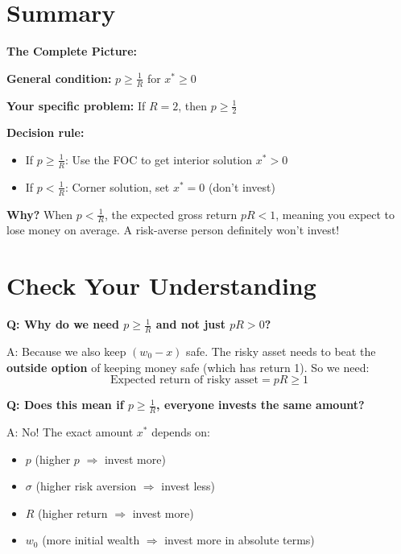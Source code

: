 \documentclass[12pt]{article}
\begin{document}
\section*{Summary}

\begin{tcolorbox}[colback=yellow!20!white,colframe=orange!75!black]
\textbf{The Complete Picture:}

\vspace{0.3cm}

\textbf{General condition:} $p \geq \frac{1}{R}$ for $x^* \geq 0$

\vspace{0.3cm}

\textbf{Your specific problem:} If $R = 2$, then $p \geq \frac{1}{2}$

\vspace{0.3cm}

\textbf{Decision rule:}
\begin{itemize}
\item If $p \geq \frac{1}{R}$: Use the FOC to get interior solution $x^* > 0$
\item If $p < \frac{1}{R}$: Corner solution, set $x^* = 0$ (don't invest)
\end{itemize}

\vspace{0.3cm}

\textbf{Why?} When $p < \frac{1}{R}$, the expected gross return $pR < 1$, meaning you expect to lose money on average. A risk-averse person definitely won't invest!
\end{tcolorbox}

\section*{Check Your Understanding}

\textbf{Q: Why do we need $p \geq \frac{1}{R}$ and not just $pR > 0$?}

A: Because we also keep $(w_0 - x)$ safe. The risky asset needs to beat the \textbf{outside option} of keeping money safe (which has return 1). So we need:
\[
\text{Expected return of risky asset} = pR \geq 1
\]

\vspace{0.3cm}

\textbf{Q: Does this mean if $p \geq \frac{1}{R}$, everyone invests the same amount?}

A: No! The exact amount $x^*$ depends on:
\begin{itemize}
\item $p$ (higher $p$ $\Rightarrow$ invest more)
\item $\sigma$ (higher risk aversion $\Rightarrow$ invest less)
\item $R$ (higher return $\Rightarrow$ invest more)
\item $w_0$ (more initial wealth $\Rightarrow$ invest more in absolute terms)
\end{itemize}
\end{document}
